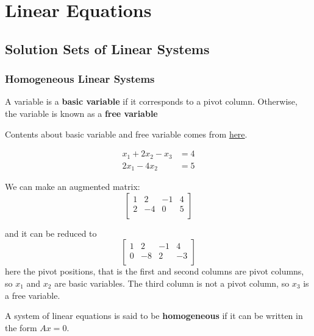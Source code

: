 \chapter{Linear Equations}

\section{Solution Sets of Linear Systems}

\subsection{Homogeneous Linear Systems}

\begin{definition}
    A variable is a \textbf{basic variable} if it corresponds to a pivot column.  Otherwise, the variable is known as a \textbf{free variable}
\end{definition}

Contents about basic variable and free variable comes from \href{https://www.math.wsu.edu/faculty/hudelson/free.html}{here}.


\begin{eg}
    \begin{align*}
        x_1 + 2x_2 -x_3 &= 4\\
        2x_1 - 4x_2 &= 5
    \end{align*}
    
    We can make an augmented matrix:
    \[
        \begin{bmatrix}
            1 & 2 & -1 &  4 \\
            2 & -4 & 0 &  5 \\
        \end{bmatrix} 
    \]

    and it can be reduced to 
   \[
        \begin{bmatrix}
            1 & 2 & -1 &  4 \\
            0 & -8 & 2 &  -3 \\
        \end{bmatrix} 
    \]
    here the pivot positions, that is the first and second columns are pivot columns, so \(x_1\) and \(x_2\) are basic variables. The third column is not a pivot column, so \(x_3\) is a free variable. 

\end{eg}


A system of linear equations is said to be \textbf{homogeneous} if it can be written in the form \(Ax = 0\).  

